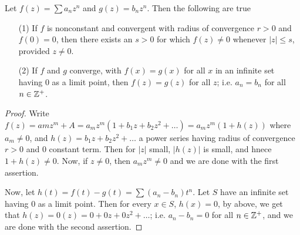 \begin{theorem}\label{2.3.2}
    Let $f(z)=\sum{a_nz^n}$ and $g(z)=b_nz^n$. Then the following are true
    \begin{enumerate}
        \item[(1)] If $f$ is nonconstant and convergent with radius of
            convergence $r>0$ and $f(0)=0$, then there exists an $s>0$ for which
             $f(z) \neq 0$ whenever $|z| \leq s$, provided  $z \neq 0$.

         \item[(2)] If $f$ and  $g$ converge, with $f(x)=g(x)$ for all $x$ in an
             infinite set having  $0$ as a limit point, then  $f(z)=g(z)$ for
             all $z$; i.e.  $a_n=b_n$ for all $n \in \mathbb{Z}^+$.
    \end{enumerate}
\end{theorem}
\begin{proof}
    Write $f(z)=amz^m+A=a_mz^m(1+b_1z+b_2z^2+\dots)=a_mz^m(1+h(z))$ where $a_m
    \neq 0$, and  $h(z)=b_1z+b_2z^2+\dots$ a power series having radius of
    convergence $r>0$ and $0$ constant term. Then for  $|z|$ small,  $|h(z)|$ is
    small, and hnece $1+h(z) \neq 0$. Now, if $z \neq 0$, then  $a_mz^m \neq 0$
    and we are done with the first assertion.

    Now, let $h(t)=f(t)-g(t)=\sum{(a_n-b_n)t^n}$. Let $S$ have an infinite set
    having  $0$ as a limit point. Then for every  $x \in S$,  $h(x)=0$, by
    above, we get that $h(z)=0(z)=0+0z+0z^2+\dots$; i.e. $a_n-b_n=0$ for all  $n
    \in \mathbb{Z}^+$, and we are done with the second assertion.
\end{proof}

